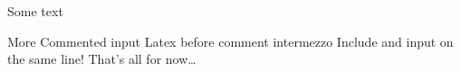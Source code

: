 Some text

More
Commented input %
Latex
 before comment %
intermezzo
Include  and input  on the same line! %
That's all for now\ldots
